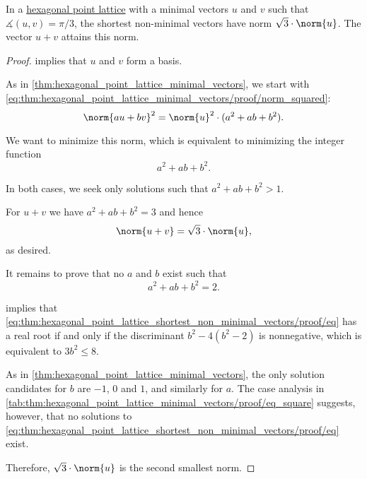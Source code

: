 \begin{proposition}\label{thm:hexagonal_point_lattice_shortest_non_minimal_vectors}
  In a \hyperref[def:hexagonal_point_lattice]{hexagonal point lattice} with a minimal vectors \( u \) and \( v \) such that \( \measuredangle(u, v) = \pi / 3 \), the shortest non-minimal vectors have norm \( \sqrt 3 \cdot \norm{u} \). The vector \( u + v \) attains this norm.
\end{proposition}
\begin{proof}
   implies that \( u \) and \( v \) form a basis.

  As in \cref{thm:hexagonal_point_lattice_minimal_vectors}, we start with \eqref{eq:thm:hexagonal_point_lattice_minimal_vectors/proof/norm_squared}:
  \begin{equation*}
    \norm{au + bv}^2 = \norm{u}^2 \cdot (a^2 + ab + b^2).
  \end{equation*}

  We want to minimize this norm, which is equivalent to minimizing the integer function
  \begin{equation}\label{eq:thm:hexagonal_point_lattice_shortest_non_minimal_vectors/proof/min}
    a^2 + ab + b^2.
  \end{equation}

  In both cases, we seek only solutions such that \( a^2 + ab + b^2 > 1 \).

  For \( u + v \) we have \( a^2 + ab + b^2 = 3 \) and hence
  \begin{equation*}
    \norm{u + v} = \sqrt 3 \cdot \norm{u},
  \end{equation*}
  as desired.

  It remains to prove that no \( a \) and \( b \) exist such that
  \begin{equation}\label{eq:thm:hexagonal_point_lattice_shortest_non_minimal_vectors/proof/eq}
    a^2 + ab + b^2 = 2.
  \end{equation}

   implies that \eqref{eq:thm:hexagonal_point_lattice_shortest_non_minimal_vectors/proof/eq} has a real root if and only if the discriminant \( b^2 - 4(b^2 - 2) \) is nonnegative, which is equivalent to \( 3b^2 \leq 8 \).

  As in \cref{thm:hexagonal_point_lattice_minimal_vectors}, the only solution candidates for \( b \) are \( -1 \), \( 0 \) and \( 1 \), and similarly for \( a \). The case analysis in \cref{tab:thm:hexagonal_point_lattice_minimal_vectors/proof/eq_square} suggests, however, that no solutions to \eqref{eq:thm:hexagonal_point_lattice_shortest_non_minimal_vectors/proof/eq} exist.

  Therefore, \( \sqrt 3 \cdot \norm{u} \) is the second smallest norm.
\end{proof}
